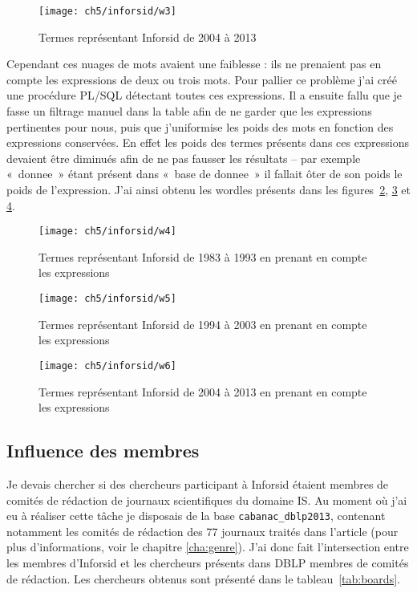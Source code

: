 			\begin{figure}[p]
				\centering
				\texttt{[image: ch5/inforsid/w3]}
				\caption{Termes représentant Inforsid de 2004 à 2013}\label{fig:n3}
			\end{figure}
		
			Cependant ces nuages de mots avaient une faiblesse : ils ne prenaient pas en compte les expressions de deux ou trois mots. Pour pallier ce problème j'ai créé une procédure PL/SQL détectant toutes ces expressions. Il a ensuite fallu que je fasse un filtrage manuel dans la table afin de ne garder que les expressions pertinentes pour nous, puis que j'uniformise les poids des mots en fonction des expressions conservées. En effet les poids des termes présents dans ces expressions devaient être diminués afin de ne pas fausser les résultats -- par exemple «~donnee~» étant présent dans «~base de donnee~» il fallait ôter de son poids le poids de l'expression. J'ai ainsi obtenu les wordles présents dans les figures~\ref{fig:w4}, \ref{fig:w5} et \ref{fig:w6}.
		
			\begin{figure}[p]
				\centering
				\texttt{[image: ch5/inforsid/w4]}
				\caption{Termes représentant Inforsid de 1983 à 1993 en prenant en compte les expressions}\label{fig:w4}
			\end{figure}
		
			\begin{figure}[p]
				\centering
				\texttt{[image: ch5/inforsid/w5]}
				\caption{Termes représentant Inforsid de 1994 à 2003 en prenant en compte les expressions}\label{fig:w5}
			\end{figure}
		
			\begin{figure}[p]
				\centering
				\texttt{[image: ch5/inforsid/w6]}
				\caption{Termes représentant Inforsid de 2004 à 2013 en prenant en compte les expressions}\label{fig:w6}
			\end{figure}
	
	
		\subsection{Influence des membres}
			Je devais chercher si des chercheurs participant à Inforsid étaient membres de comités de rédaction de journaux scientifiques du domaine IS. Au moment où j\rq{}ai eu à réaliser cette tâche je disposais de la base \texttt{cabanac\_dblp2013}, contenant notamment les comités de rédaction des 77 journaux traités dans l\rq{}article \citep{shaping} (pour plus d\rq{}informations, voir le chapitre \ref{cha:genre}). J'ai donc fait l\rq{}intersection entre les membres d\rq{}Inforsid et les chercheurs présents dans DBLP membres de comités de rédaction. Les chercheurs obtenus sont présenté dans le tableau~\ref{tab:boards}.
		
